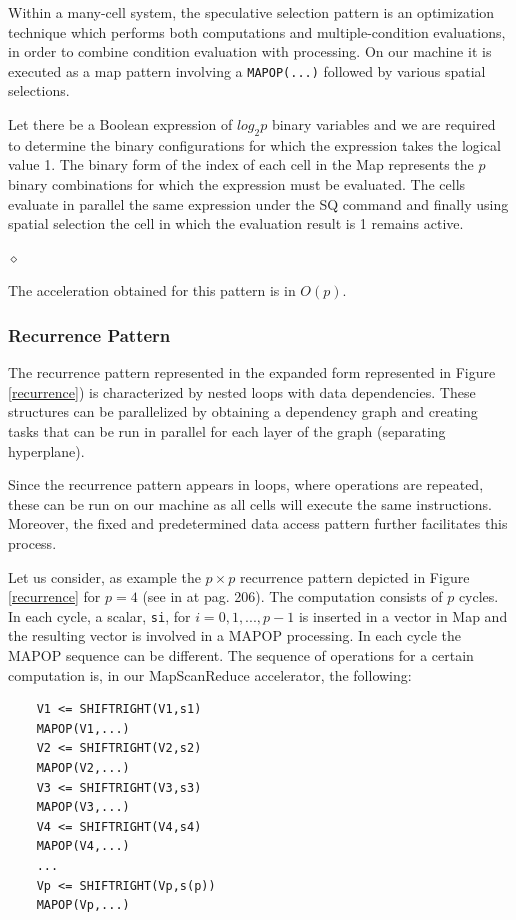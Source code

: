 Within a many-cell system, the speculative selection pattern is an optimization technique which  performs both computations and multiple-condition evaluations, in order to combine condition evaluation with processing. On our machine it is executed as a map pattern involving a {\tt MAPOP(...)} followed by various spatial selections.

\begin{exemplu}
Let there be a Boolean expression of $log_2 p$ binary variables and we are required to determine the binary configurations for which the expression takes the logical value 1. The binary form of the index of each cell in the Map represents the $p$ binary combinations for which the expression must be evaluated. The cells evaluate in parallel the same expression under the SQ command and finally using spatial selection the cell in which the evaluation result is 1 remains active.

$\diamond$
\end{exemplu}

The acceleration obtained for this  pattern is in $O(p)$.

\subsubsection{Recurrence Pattern}

The recurrence pattern represented in the expanded form  represented in  Figure \ref{recurrence}) is characterized by nested loops with data dependencies. These structures can be parallelized by obtaining a dependency graph and creating tasks that can be run in parallel for each layer of the graph (separating hyperplane).


Since the recurrence pattern appears in loops, where operations are repeated, these can be run on our machine as all cells will execute the same instructions. Moreover, the fixed and predetermined data access pattern further facilitates this process.

Let us consider, as example the $p \times p$ recurrence pattern depicted in Figure \ref{recurrence} for $p=4$ (see in \cite{McCool12} at pag. 206). The computation consists of $p$ cycles. In each cycle, a scalar, {\tt si}, for $i = 0,1,...,p-1$ is inserted in a vector in  Map and the resulting vector is involved in a MAPOP processing. In each cycle the MAPOP sequence can be different. The sequence of operations for a certain computation is, in our MapScanReduce accelerator, the following:
\begin{verbatim}
    V1 <= SHIFTRIGHT(V1,s1)
    MAPOP(V1,...)
    V2 <= SHIFTRIGHT(V2,s2)
    MAPOP(V2,...)
    V3 <= SHIFTRIGHT(V3,s3)
    MAPOP(V3,...)
    V4 <= SHIFTRIGHT(V4,s4)
    MAPOP(V4,...)
    ...
    Vp <= SHIFTRIGHT(Vp,s(p))
    MAPOP(Vp,...)
\end{verbatim}


